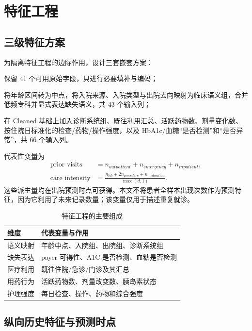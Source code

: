 \documentclass[UTF8,a4paper,11pt,fontset=none]{ctexart}
\begin{document}
\section{特征工程}

\subsection{三级特征方案}

为隔离特征工程的边际作用，设计三套嵌套方案：
\begin{description}[leftmargin=0pt,labelindent=0pt]
  \item[Raw] 保留 41 个可用原始字段，只进行必要填补与编码；
  \item[Cleaned] 将年龄区间转为中点，将入院来源、入院类型与出院去向映射为临床语义组，合并低频专科并显式表达缺失语义，共 43 个输入列；
  \item[Engineered] 在 Cleaned 基础上加入诊断系统组、既往利用汇总、活跃药物数、剂量变化数、按住院日标准化的检查/药物/操作强度，以及 HbA1c/血糖“是否检测”和“是否异常”，共 66 个输入列。
\end{description}

代表性变量为
\begin{align}
\text{prior visits} &= n_{outpatient}+n_{emergency}+n_{inpatient},\\
\text{care intensity} &= \frac{n_{lab}+2n_{procedure}+n_{medication}}{\max(d,1)}.
\end{align}
这些派生量均在出院预测时点可获得。本文不将患者全样本出现次数作为预测特征，因为它利用了未来记录数量；该变量仅用于描述重复就诊。

\begin{table}[H]
\centering
\caption{特征工程的主要组成}
\begin{tabularx}{0.88\textwidth}{lX}
\toprule
维度 & 代表变量与作用 \\
\midrule
语义映射 & 年龄中点、入院组、出院组、诊断系统组 \\
缺失表达 & payer 可得性、A1C 是否检测、血糖是否检测 \\
医疗利用 & 既往住院/急诊/门诊及其汇总 \\
用药行为 & 活跃药物数、剂量改变数、胰岛素状态 \\
护理强度 & 每日检查、操作、药物和综合强度 \\
\bottomrule
\end{tabularx}
\end{table}

\subsection{纵向历史特征与预测时点}
\end{document}
